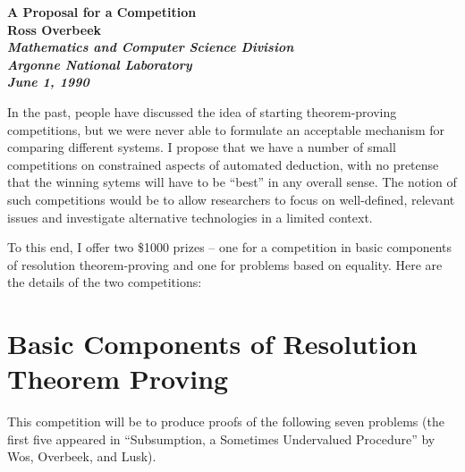 \topmargin -0.3in
\textheight 8.8in
\textwidth 6.5in
\parskip 6pt
\oddsidemargin=0.0in
\evensidemargin=0.0in


\begin{center}
{\LARGE\bf 			 A Proposal for a Competition } \\[.15in]
\Large\bf Ross Overbeek \\[.05in]
\Large\em Mathematics and Computer Science Division \\
\Large\em Argonne National Laboratory\\[.2in]
June 1, 1990
\end{center}


In the past, people have discussed the idea of starting theorem-proving
competitions, but we were never able to formulate an acceptable mechanism
for comparing different systems.  I propose that we have a number of small
competitions on constrained aspects of automated deduction, with no pretense
that the winning sytems will have to be ``best'' in any overall sense.  The
notion of such competitions would be to allow researchers to focus on
well-defined, relevant issues and investigate alternative technologies in a
limited context.

To this end, I offer two \$1000 prizes -- one for a competition in basic
components of resolution theorem-proving and one for problems based on
equality.   Here are the details of the two competitions:


\section*{Basic Components of Resolution Theorem Proving}

This competition will be to produce proofs of the following seven problems
(the first five appeared in ``Subsumption, a Sometimes Undervalued Procedure'' by
Wos, Overbeek, and Lusk).

